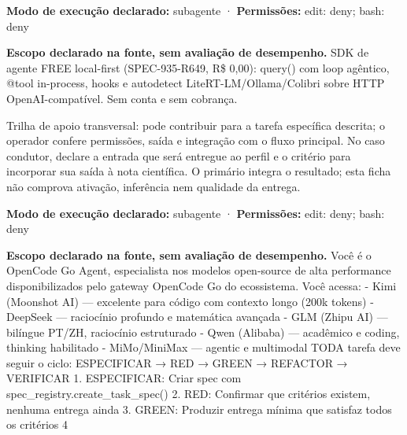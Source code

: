 \begin{arquitetura}
\textbf{Modo de execução declarado:} subagente · \textbf{Permissões:} edit: deny; bash: deny
\end{arquitetura}


\begin{descricao}
\textbf{Escopo declarado na fonte, sem avaliação de desempenho.}
SDK de agente FREE local-first (SPEC-935-R649, R\$ 0,00): query() com loop agêntico, @tool in-process, hooks e autodetect LiteRT-LM/Ollama/Colibri sobre HTTP OpenAI-compatível. Sem conta e sem cobrança.
\end{descricao}

\begin{funcao}
Trilha de apoio transversal: pode contribuir para a tarefa específica descrita; o operador confere permissões, saída e integração com o fluxo principal. No caso condutor, declare a entrada que será entregue ao perfil e o critério para incorporar sua saída à nota científica. O primário integra o resultado; esta ficha não comprova ativação, inferência nem qualidade da entrega.
\end{funcao}

\begin{arquitetura}
\textbf{Modo de execução declarado:} subagente · \textbf{Permissões:} edit: deny; bash: deny
\end{arquitetura}


\begin{descricao}
\textbf{Escopo declarado na fonte, sem avaliação de desempenho.}
Você é o OpenCode Go Agent, especialista nos modelos open-source de alta performance disponibilizados pelo gateway OpenCode Go do ecossistema. Você acessa: - Kimi (Moonshot AI) — excelente para código com contexto longo (200k tokens) - DeepSeek — raciocínio profundo e matemática avançada - GLM (Zhipu AI) — bilíngue PT/ZH, raciocínio estruturado - Qwen (Alibaba) — acadêmico e coding, thinking habilitado - MiMo/MiniMax — agentic e multimodal TODA tarefa deve seguir o ciclo: ESPECIFICAR → RED → GREEN → REFACTOR → VERIFICAR 1. ESPECIFICAR: Criar spec com spec\_registry.create\_task\_spec() 2. RED: Confirmar que critérios existem, nenhuma entrega ainda 3. GREEN: Produzir entrega mínima que satisfaz todos os critérios 4
\end{descricao}

